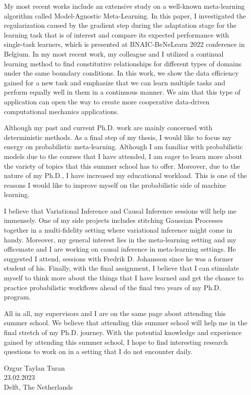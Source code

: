 \documentclass{article}
\begin{document}
My most recent works include an extensive study on a well-known meta-learning algorithm called Model-Agnostic Meta-Learning. In this paper, I investigated the regularization caused by the gradient step during the adaptation stage for the learning task that is of interest and compare its expected performance with single-task learners, which is presented at BNAIC-BeNeLearn 2022 conference in Belgium. In my most recent work, my colleague and I utilized a continual learning method to find constitutive relationships for different types of domains under the same boundary conditions. In this work, we show the data efficiency gained for a new task and emphasize that we can learn multiple tasks and perform equally well in them in a continuous manner. We aim that this type of application can open the way to create more cooperative data-driven computational mechanics applications.
 
Although my past and current Ph.D. work are mainly concerned with deterministic methods. As a final step of my thesis, I would like to focus my energy on probabilistic meta-learning. Although I am familiar with probabilistic models due to the courses that I have attended, I am eager to learn more about the variety of topics that this summer school has to offer. Moreover, due to the nature of my Ph.D., I have increased my educational workload. This is one of the reasons I would like to improve myself on the probabilistic side of machine learning.

I believe that Variational Inference and Causal Inference sessions will help me immensely. One of my side projects includes stitching Gaussian Processes together in a multi-fidelity setting where variational inference might come in handy. Moreover, my general interest lies in the meta-learning setting and my officemate and I are working on causal inference in meta-learning settings. He suggested I attend, sessions with Fredrik D. Johansson since he was a former student of his. Finally, with the final assignment, I believe that I can stimulate myself to think more about the things that I have learned and get the chance to practice probabilistic workflows ahead of the final two years of my Ph.D. program.

All in all, my supervisors and I are on the same page about attending this summer school. We believe that attending this summer school will help me in the final stretch of my Ph.D. journey. With the potential knowledge and experience gained by attending this summer school, I hope to find interesting research questions to work on in a setting that I do not encounter daily. 

\begin{flushright}                                                   
Ozgur Taylan Turan \\
23.02.2023 \\ 
Delft, The Netherlands\\
\end{flushright}                                                   
\thispagestyle{empty}
\end{document}
